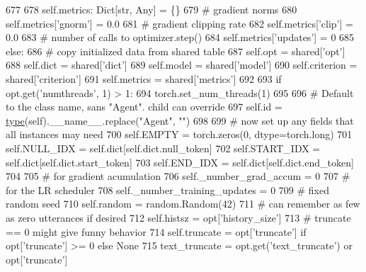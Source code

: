 \begin{DoxyCode}
677 
678             self.metrics: Dict[str, Any] = \{\}
679             \textcolor{comment}{# gradient norms}
680             self.metrics[\textcolor{stringliteral}{'gnorm'}] = 0.0
681             \textcolor{comment}{# gradient clipping rate}
682             self.metrics[\textcolor{stringliteral}{'clip'}] = 0.0
683             \textcolor{comment}{# number of calls to optimizer.step()}
684             self.metrics[\textcolor{stringliteral}{'updates'}] = 0
685         \textcolor{keywordflow}{else}:
686             \textcolor{comment}{# copy initialized data from shared table}
687             self.opt = shared[\textcolor{stringliteral}{'opt'}]
688             self.dict = shared[\textcolor{stringliteral}{'dict'}]
689             self.model = shared[\textcolor{stringliteral}{'model'}]
690             self.criterion = shared[\textcolor{stringliteral}{'criterion'}]
691             self.metrics = shared[\textcolor{stringliteral}{'metrics'}]
692 
693         \textcolor{keywordflow}{if} opt.get(\textcolor{stringliteral}{'numthreads'}, 1) > 1:
694             torch.set\_num\_threads(1)
695 
696         \textcolor{comment}{# Default to the class name, sans "Agent". child can override}
697         self.id = \hyperlink{namespaceparlai_1_1agents_1_1tfidf__retriever_1_1build__tfidf_ad5dfae268e23f506da084a9efb72f619}{type}(self).\_\_name\_\_.replace(\textcolor{stringliteral}{"Agent"}, \textcolor{stringliteral}{""})
698 
699         \textcolor{comment}{# now set up any fields that all instances may need}
700         self.EMPTY = torch.zeros(0, dtype=torch.long)
701         self.NULL\_IDX = self.dict[self.dict.null\_token]
702         self.START\_IDX = self.dict[self.dict.start\_token]
703         self.END\_IDX = self.dict[self.dict.end\_token]
704 
705         \textcolor{comment}{# for gradient acumulation}
706         self.\_number\_grad\_accum = 0
707         \textcolor{comment}{# for the LR scheduler}
708         self.\_number\_training\_updates = 0
709         \textcolor{comment}{# fixed random seed}
710         self.random = random.Random(42)
711         \textcolor{comment}{# can remember as few as zero utterances if desired}
712         self.histsz = opt[\textcolor{stringliteral}{'history\_size'}]
713         \textcolor{comment}{# truncate == 0 might give funny behavior}
714         self.truncate = opt[\textcolor{stringliteral}{'truncate'}] \textcolor{keywordflow}{if} opt[\textcolor{stringliteral}{'truncate'}] >= 0 \textcolor{keywordflow}{else} \textcolor{keywordtype}{None}
715         text\_truncate = opt.get(\textcolor{stringliteral}{'text\_truncate'}) \textcolor{keywordflow}{or} opt[\textcolor{stringliteral}{'truncate'}]

\end{DoxyCode}
